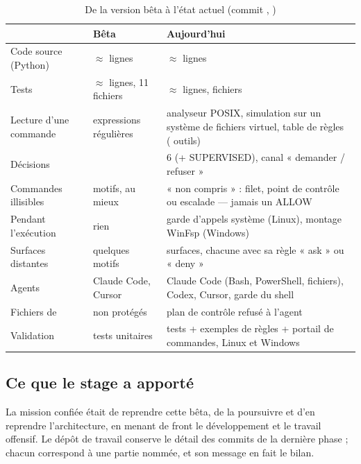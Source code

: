 \begin{table}[htbp]
\centering
\caption{De la version bêta à l'état actuel (commit \commitref{}, \datecommitref{})}
\label{tab:depart}
\small
\begin{tabularx}{\linewidth}{@{}L{4.1cm}YY@{}}
\toprule
& \textbf{Bêta \betaversion{}} & \textbf{Aujourd'hui} \\
\midrule
Code source (Python) & $\approx$ \betalignessrc{} lignes & $\approx$ \lignessrc{} lignes \\
Tests & $\approx$ \betalignestests{} lignes, 11 fichiers & $\approx$ \lignestests{} lignes,
  \fichierstests{} fichiers \\
Lecture d'une commande & \betaregex{} expressions régulières & analyseur POSIX, simulation sur
  un système de fichiers virtuel, table de \nbregles{} règles (\nboutils{} outils) \\
Décisions & \betadecisions{} & 6 (+ SUPERVISED), canal « demander / refuser » \\
Commandes illisibles & motifs, au mieux & « non compris » : filet, point de contrôle ou
  escalade --- jamais un ALLOW \\
Pendant l'exécution & rien & garde d'appels système (Linux), montage WinFsp (Windows) \\
Surfaces distantes & quelques motifs & \nbsurfaces{} surfaces, chacune avec sa
  règle « ask » ou « deny » \\
Agents & Claude Code, Cursor & Claude Code (Bash, PowerShell, fichiers), Codex, Cursor,
  garde du shell \\
Fichiers de \demo{} & non protégés & plan de contrôle refusé à l'agent \\
Validation & tests unitaires & tests + exemples de règles + portail de \nbcorpus{}
  commandes, Linux et Windows \\
\bottomrule
\end{tabularx}
\end{table}

\subsection{Ce que le stage a apporté}
La mission confiée était de reprendre cette bêta, de la poursuivre et d'en reprendre
l'architecture, en menant de front le développement et le travail offensif. Le dépôt de
travail conserve le détail des \nbcommits{} commits de la dernière phase ; chacun
correspond à une partie nommée, et son message en fait le bilan.

